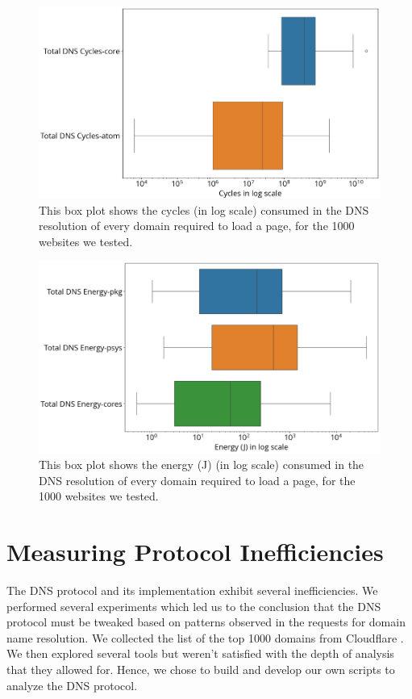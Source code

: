 \documentclass[conference]{IEEEtran}
\begin{document}
\begin{figure}[htbp]
    \centering
    \includegraphics[width=1\linewidth]{images/cycles.png}
    \caption{This box plot shows the cycles (in log scale) consumed in the DNS resolution of every domain required to load a page, for the 1000 websites we tested.}
    \label{fig:dns-cycles}
\end{figure}
\begin{figure}[htbp]
    \centering
    \includegraphics[width=1\linewidth]{images/energy.png}
    \caption{This box plot shows the energy (J) (in log scale) consumed in the DNS resolution of every domain required to load a page, for the 1000 websites we tested.}
    \label{fig:dns-energy}
\end{figure}

\section{Measuring Protocol Inefficiencies}
\label{Measuring Protocol Inefficiencies}
The DNS protocol and its implementation exhibit several inefficiencies. We performed several experiments which led us to the conclusion that the DNS protocol must be tweaked based on patterns observed in the requests for domain name resolution. We collected the list of the top 1000 domains from Cloudflare \cite{cloudflare}. We then explored several tools but weren't satisfied with the depth of analysis that they allowed for. Hence, we chose to build and develop our own scripts to analyze the DNS protocol. 
\end{document}
